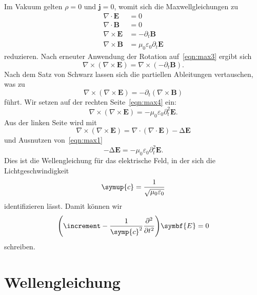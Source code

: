 \documentclass{scrartcl}
\begin{document}
Im Vakuum gelten $\rho = 0$ und $\symbf{j} = 0$, womit sich die Maxwellgleichungen zu
\begin{align}
  \nabla \cdot  \symbf{E} &= 0 \label{eqn:max1} \\
  \nabla \cdot  \symbf{B} &= 0 \label{eqn:max2} \\
  \nabla \times \symbf{E} &= - \partial_t \symbf{B} \label{eqn:max3} \\
  \nabla \times \symbf{B} &= \mu_0 \varepsilon_0 \partial_t \symbf{E} \label{eqn:max4}
\end{align}
reduzieren.
Nach erneuter Anwendung der Rotation auf~\eqref{eqn:max3} ergibt sich
\begin{equation}
  \nabla \times \left( \nabla \times \symbf{E} \right) = \nabla \times \left( - \partial_t \symbf{B} \right) .
\end{equation}
Nach dem Satz von Schwarz lassen sich die partiellen Ableitungen vertauschen, was zu
\begin{equation}
  \nabla \times \left( \nabla \times \symbf{E} \right) = - \partial_t \! \left( \nabla \times \symbf{B} \right)
\end{equation}
führt.
Wir setzen auf der rechten Seite~\eqref{eqn:max4} ein:
\begin{equation}
  \nabla \times \left( \nabla \times \symbf{E} \right) = - \mu_0 \varepsilon_0 \partial_t^2 \symbf{E} .
\end{equation}
Aus der linken Seite wird mit
\begin{equation}
  \nabla \times \left( \nabla \times \symbf{E} \right) = \nabla \cdot \left( \nabla \cdot \symbf{E} \right) - \increment \symbf{E}
\end{equation}
und Ausnutzen von~\eqref{eqn:max1}
\begin{equation}
  - \increment\symbf{E} = -\mu_0 \varepsilon_0 \partial_t^2 \symbf{E} .
\end{equation}
Dies ist die Wellengleichung für das elektrische Feld, in der sich die Lichtgeschwindigkeit
\begin{equation}
  \symup{c} = \frac{1}{\sqrt{\mu_0 \varepsilon_0}}
\end{equation}
identifizieren lässt.
Damit können wir
\begin{equation}
  \left(\increment - \frac{1}{\symp{c}^2} \frac{\partial^2}{\partial t^2} \right) \! \symbf{E} = 0
\end{equation}
schreiben.

\section{Wellengleichung}
\end{document}
